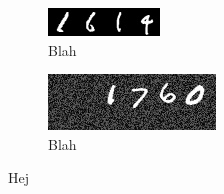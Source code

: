 
\begin{figure}
    \centering
    \begin{subfigure}{0.5\textwidth}
        \centering
        \includegraphics[scale=2.0]{resources/mnist4.jpg}
        \caption{Blah}
        \label{fig:mnist4}
    \end{subfigure}%
    \begin{subfigure}{0.5\textwidth}
        \centering
        \includegraphics[scale=2.0]{resources/random_pad.jpg}
        \caption{Blah}
        \label{fig:mnist_random_pad}
    \end{subfigure}
    
    \caption{Hej}
\end{figure}